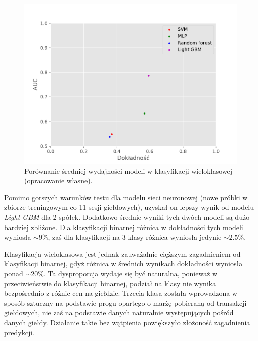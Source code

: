 \documentclass[a4paper, twoside, 11pt, openright]{article}
\begin{document}
\begin{figure}[H]
\centering \includegraphics[scale=0.9]{img/summary-discrete-summary.pdf}
\caption{Porównanie średniej wydajności modeli w klasyfikacji wieloklasowej (opracowanie własne).}
\label{img:summary-discrete}
\end{figure}


Pomimo gorszych warunków testu dla modelu sieci neuronowej (nowe próbki w zbiorze treningowym co 11 sesji giełdowych), uzyskał on lepszy wynik od modelu \textit{Light GBM} dla 2 spółek. Dodatkowo średnie wyniki tych dwóch modeli są dużo bardziej zbliżone. Dla klasyfikacji binarnej różnica w dokładności tych modeli wyniosła $\sim 9\%$, zaś dla klasyfikacji na 3 klasy różnica wyniosła jedynie $\sim 2.5\%$. 

\bigskip

Klasyfikacja wieloklasowa jest jednak zauważalnie cięższym zagadnieniem od klasyfikacji binarnej, gdyż różnica w średnich wynikach dokładności wyniosła ponad $\sim 20\%$. Ta dysproporcja wydaje się być naturalna, ponieważ w przeciwieństwie do klasyfikacji binarnej, podział na klasy nie wynika bezpośrednio z różnic cen na giełdzie. Trzecia klasa została wprowadzona w sposób sztuczny na podstawie progu opartego o marżę pobieraną od transakcji giełdowych, nie zaś na podstawie danych naturalnie występujących pośród danych giełdy. Działanie takie bez wątpienia powiększyło złożoność zagadnienia predykcji.

\bigskip
\end{document}
